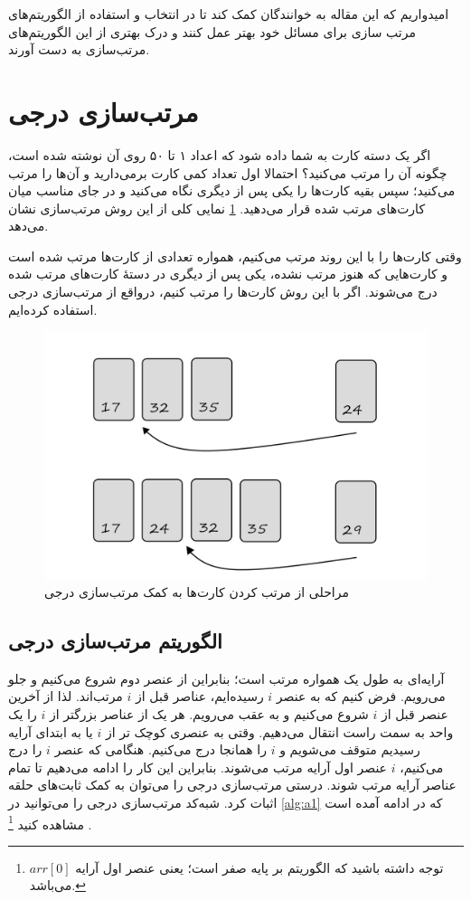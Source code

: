 \documentclass[12pt]{article}
\begin{document}
امیدواریم که این مقاله به خوانندگان کمک کند تا در انتخاب و استفاده از الگوریتم‌های مرتب سازی برای مسائل خود بهتر عمل کنند و درک بهتری از این الگوریتم‌های مرتب‌سازی به دست آورند.


\section{مرتب‌سازی درجی\protect{}}

اگر یک دسته کارت به شما داده شود که اعداد ۱ تا ۵۰ روی آن نوشته شده است، چگونه آن را مرتب
می‌کنید؟
احتمالا اول تعداد کمی کارت برمی‌دارید و آن‌ها را مرتب می‌کنید؛
سپس بقیه کارت‌ها را یکی پس از دیگری نگاه می‌کنید
و در جای مناسب میان کارت‌های مرتب شده قرار می‌دهید.
\cref{fig:f1}
نمایی کلی از این روش مرتب‌سازی نشان می‌دهد.

وقتی کارت‌ها را با این روند مرتب می‌کنیم،
همواره تعدادی از کارت‌ها مرتب شده است و کارت‌هایی که هنوز مرتب نشده، یکی پس از دیگری
در دستهٔ کارت‌های مرتب شده درج
می‌شوند.
اگر با این روش کارت‌ها را مرتب کنیم، درواقع از مرتب‌سازی درجی استفاده کرده‌ایم.

\begin{figure}[H]
  \centering
  \includegraphics[width=.8\textwidth]{figs/sortingCards2.jpg}
  \caption{
    مراحلی از مرتب کردن کارت‌ها به کمک مرتب‌سازی درجی
  }
  \label{fig:f1}
\end{figure}

\subsection*{الگوریتم مرتب‌سازی درجی}
آرایه‌ای به طول یک همواره مرتب است؛ بنابراین از عنصر دوم شروع می‌کنیم و جلو می‌رویم.
فرض کنیم که به عنصر
$i$
رسیده‌ایم،
عناصر قبل از
$i$
مرتب‌اند.
لذا از آخرین عنصر قبل از
$i$
شروع می‌کنیم و به عقب می‌رویم.
هر یک از عناصر بزرگتر از
$i$
را یک واحد به سمت راست انتقال
می‌دهیم.
وقتی به عنصری کوچک تر از
$i$
یا به ابتدای آرایه رسیدیم
متوقف می‌شویم و
$i$
را همانجا درج
می‌کنیم.
هنگامی که عنصر
$i$
را درج می‌کنیم،
$i$
عنصر اول آرایه مرتب می‌شوند.
بنابراین این کار را ادامه می‌دهیم تا تمام عناصر آرایه مرتب شوند.
درستی مرتب‌سازی درجی را می‌توان به کمک ثابت‌های حلقه
اثبات کرد.
\cite{clrs}
شبه‌کد مرتب‌سازی درجی را می‌توانید در
\cref{alg:a1}
که در ادامه آمده است
مشاهده کنید
\footnote{
  توجه داشته باشید که الگوریتم بر پایه صفر است؛ یعنی عنصر اول آرایه
  $arr[0]$
  می‌باشد.
}
.
\end{document}
